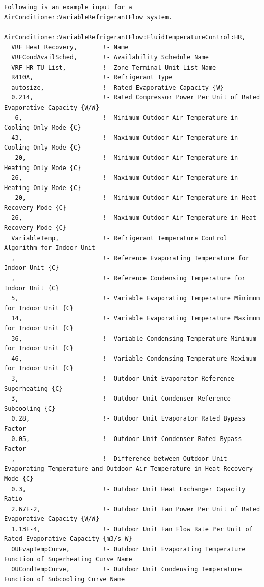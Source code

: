 \begin{lstlisting}
Following is an example input for a AirConditioner:VariableRefrigerantFlow system.

AirConditioner:VariableRefrigerantFlow:FluidTemperatureControl:HR,
  VRF Heat Recovery,       !- Name
  VRFCondAvailSched,       !- Availability Schedule Name
  VRF HR TU List,          !- Zone Terminal Unit List Name
  R410A,                   !- Refrigerant Type
  autosize,                !- Rated Evaporative Capacity {W}
  0.214,                   !- Rated Compressor Power Per Unit of Rated Evaporative Capacity {W/W}
  -6,                      !- Minimum Outdoor Air Temperature in Cooling Only Mode {C}
  43,                      !- Maximum Outdoor Air Temperature in Cooling Only Mode {C}
  -20,                     !- Minimum Outdoor Air Temperature in Heating Only Mode {C}
  26,                      !- Maximum Outdoor Air Temperature in Heating Only Mode {C}
  -20,                     !- Minimum Outdoor Air Temperature in Heat Recovery Mode {C}
  26,                      !- Maximum Outdoor Air Temperature in Heat Recovery Mode {C}
  VariableTemp,            !- Refrigerant Temperature Control Algorithm for Indoor Unit
  ,                        !- Reference Evaporating Temperature for Indoor Unit {C}
  ,                        !- Reference Condensing Temperature for Indoor Unit {C}
  5,                       !- Variable Evaporating Temperature Minimum for Indoor Unit {C}
  14,                      !- Variable Evaporating Temperature Maximum for Indoor Unit {C}
  36,                      !- Variable Condensing Temperature Minimum for Indoor Unit {C}
  46,                      !- Variable Condensing Temperature Maximum for Indoor Unit {C}
  3,                       !- Outdoor Unit Evaporator Reference Superheating {C}
  3,                       !- Outdoor Unit Condenser Reference Subcooling {C}
  0.28,                    !- Outdoor Unit Evaporator Rated Bypass Factor
  0.05,                    !- Outdoor Unit Condenser Rated Bypass Factor
  ,                        !- Difference between Outdoor Unit Evaporating Temperature and Outdoor Air Temperature in Heat Recovery Mode {C}
  0.3,                     !- Outdoor Unit Heat Exchanger Capacity Ratio
  2.67E-2,                 !- Outdoor Unit Fan Power Per Unit of Rated Evaporative Capacity {W/W}
  1.13E-4,                 !- Outdoor Unit Fan Flow Rate Per Unit of Rated Evaporative Capacity {m3/s-W}
  OUEvapTempCurve,         !- Outdoor Unit Evaporating Temperature Function of Superheating Curve Name
  OUCondTempCurve,         !- Outdoor Unit Condensing Temperature Function of Subcooling Curve Name

\end{lstlisting}

